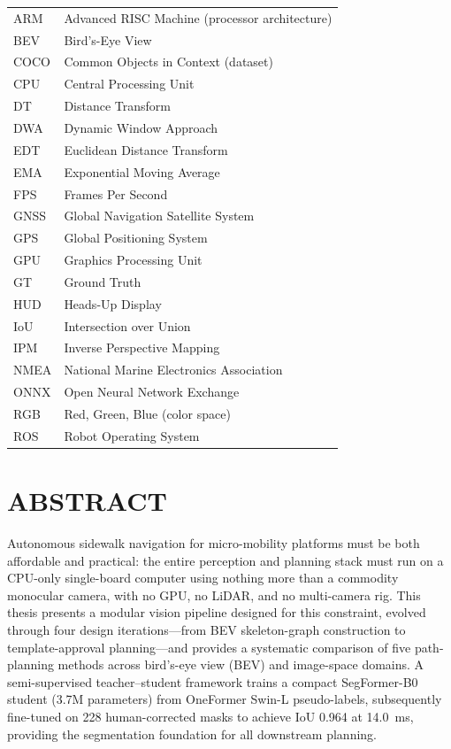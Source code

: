 \documentclass[12pt,letterpaper,oneside]{report}
\begin{document}
\begin{longtable}{@{}l@{\hspace{2em}}l@{}}
ARM     & Advanced RISC Machine (processor architecture) \\
BEV     & Bird's-Eye View \\
COCO    & Common Objects in Context (dataset) \\
CPU     & Central Processing Unit \\
DT      & Distance Transform \\
DWA     & Dynamic Window Approach \\
EDT     & Euclidean Distance Transform \\
EMA     & Exponential Moving Average \\
FPS     & Frames Per Second \\
GNSS    & Global Navigation Satellite System \\
GPS     & Global Positioning System \\
GPU     & Graphics Processing Unit \\
GT      & Ground Truth \\
HUD     & Heads-Up Display \\
IoU     & Intersection over Union \\
IPM     & Inverse Perspective Mapping \\
NMEA    & National Marine Electronics Association \\
ONNX    & Open Neural Network Exchange \\
RGB     & Red, Green, Blue (color space) \\
ROS     & Robot Operating System \\
\end{longtable}

\newpage

\chapter*{ABSTRACT}

Autonomous sidewalk navigation for micro-mobility platforms must be both affordable and practical: the entire perception and planning stack must run on a CPU-only single-board computer using nothing more than a commodity monocular camera, with no GPU, no LiDAR, and no multi-camera rig.  This thesis presents a modular vision pipeline designed for this constraint, evolved through four design iterations---from BEV skeleton-graph construction to template-approval planning---and provides a systematic comparison of five path-planning methods across bird's-eye view (BEV) and image-space domains. A semi-supervised teacher--student framework trains a compact SegFormer-B0 student (3.7M parameters) from OneFormer Swin-L pseudo-labels, subsequently fine-tuned on 228 human-corrected masks to achieve IoU 0.964 at \SI{14.0}{ms}, providing the segmentation foundation for all downstream planning.
\end{document}

